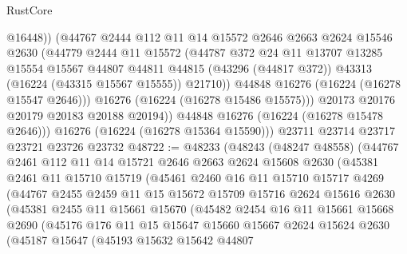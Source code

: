 \begin{lexlean}{RustCore}
\begin{coremodule}
                  @16448))
              (@44767
                @2444
                @112
                @11
                @14
                @15572
                @2646
                @2663
                @2624
                @15546
                @2630
                (@44779
                  @2444
                  @11
                  @15572
                  (@44787
                    @372
                    @24
                    @11
                    @13707
                    @13285
                    @15554
                    @15567
                    @44807
                    @44811
                    @44815
                    (@43296 (@44817 @372))
                    @43313
                    (@16224 (@43315 @15567 @15555))
                    @21710))
                @44848
                @16276
                (@16224 (@16278 @15547 @2646)))
              @16276
              (@16224 (@16278 @15486 @15575)))
            @20173
            @20176
            @20179
            @20183
            @20188
            @20194))
        @44848
        @16276
        (@16224 (@16278 @15478 @2646)))
      @16276
      (@16224 (@16278 @15364 @15590)))
    @23711
    @23714
    @23717
    @23721
    @23726
    @23732
@48722 := @48233
    (@48243
      (@48247 @48558)
      (@44767
        @2461
        @112
        @11
        @14
        @15721
        @2646
        @2663
        @2624
        @15608
        @2630
        (@45381
          @2461
          @11
          @15710
          @15719
          (@45461
            @2460
            @16
            @11
            @15710
            @15717
            @4269
            (@44767
              @2455
              @2459
              @11
              @15
              @15672
              @15709
              @15716
              @2624
              @15616
              @2630
              (@45381
                @2455
                @11
                @15661
                @15670
                (@45482
                  @2454
                  @16
                  @11
                  @15661
                  @15668
                  @2690
                  (@45176
                    @176
                    @11
                    @15
                    @15647
                    @15660
                    @15667
                    @2624
                    @15624
                    @2630
                    (@45187
                      @15647
                      (@45193
                        @15632
                        @15642
                        @44807

\end{coremodule}
\end{lexlean}
